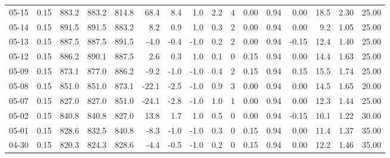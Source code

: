 \begin{threeparttable}
{\begin{tabular}{lrrrrrrrrrrrrrrr}
  05-15 &     0.15 & 883.2 & 883.2 & 814.8 &       68.4 &            8.4 &                      1.0 &                 2.2 &              4 &       0.00 &      0.94 &           0.00 &             18.5 &            2.30 &                  25.00 \\
  05-14 &     0.15 & 891.5 & 891.5 & 883.2 &        8.2 &            0.9 &                      1.0 &                 0.3 &              2 &       0.00 &      0.94 &           0.00 &              9.2 &            1.05 &                  25.00 \\
  05-13 &     0.15 & 887.5 & 887.5 & 891.5 &       -4.0 &           -0.4 &                     -1.0 &                 0.2 &              2 &       0.00 &      0.94 &          -0.15 &             12.4 &            1.40 &                  25.00 \\
  05-12 &     0.15 & 886.2 & 890.1 & 887.5 &        2.6 &            0.3 &                      1.0 &                 0.1 &              0 &       0.15 &      0.94 &           0.00 &             14.4 &            1.63 &                  25.00 \\
  05-09 &     0.15 & 873.1 & 877.0 & 886.2 &       -9.2 &           -1.0 &                     -1.0 &                 0.4 &              2 &       0.15 &      0.94 &           0.15 &             15.5 &            1.74 &                  25.00 \\
  05-08 &     0.15 & 851.0 & 851.0 & 873.1 &      -22.1 &           -2.5 &                     -1.0 &                 0.9 &              3 &       0.00 &      0.94 &           0.00 &             14.5 &            1.65 &                  20.00 \\
  05-07 &     0.15 & 827.0 & 827.0 & 851.0 &      -24.1 &           -2.8 &                     -1.0 &                 1.0 &              1 &       0.00 &      0.94 &           0.00 &             12.3 &            1.44 &                  25.00 \\
  05-02 &     0.15 & 840.8 & 840.8 & 827.0 &       13.8 &            1.7 &                      1.0 &                 0.5 &              0 &       0.00 &      0.94 &          -0.15 &             10.1 &            1.22 &                  30.00 \\
  05-01 &     0.15 & 828.6 & 832.5 & 840.8 &       -8.3 &           -1.0 &                     -1.0 &                 0.3 &              0 &       0.15 &      0.94 &           0.00 &             11.4 &            1.37 &                  35.00 \\
  04-30 &     0.15 & 820.3 & 824.3 & 828.6 &       -4.4 &           -0.5 &                     -1.0 &                 0.2 &              0 &       0.15 &      0.94 &           0.00 &             12.2 &            1.46 &                  35.00 \\

\end{tabular}}
\end{threeparttable}
